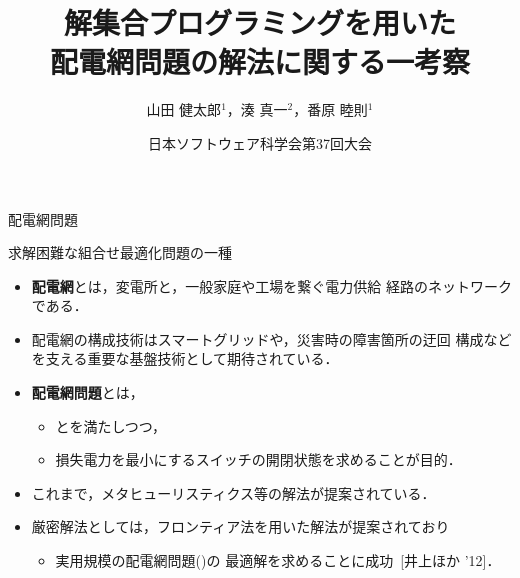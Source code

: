 \documentclass[dvipdfmx,11pt]{beamer}
\title{解集合プログラミングを用いた\\配電網問題の解法に関する一考察}
\author[山田 健太郎，湊 真一，番原 睦則]{山田 健太郎$^1$，湊 真一$^2$，番原 睦則$^1$}
\date{日本ソフトウェア科学会第37回大会}
\institute{1.名古屋大学 大学院情報学研究科 \\ 2.京都大学 大学院情報学研究科}
\begin{document}
\begin{frame}{}
  \titlepage
\end{frame}

\begin{frame}{配電網問題}
  \begin{alertblock}{}\centering
    求解困難な組合せ最適化問題の一種
  \end{alertblock}
  \vfill
  \begin{itemize}
  \item \alert{\bf 配電網}とは，変電所と，一般家庭や工場を繋ぐ電力供給
    経路のネットワークである．
  \item  配電網の構成技術はスマートグリッドや，災害時の障害箇所の迂回
    構成などを支える重要な基盤技術として期待されている．
  \item \alert{\bf 配電網問題}とは，
    \begin{itemize}
    \item {}とを満たしつつ，
    \item 損失電力を最小にするスイッチの開閉状態を求めることが目的．
    \end{itemize}
  \item これまで，メタヒューリスティクス等の解法が提案されている．
  \item 厳密解法としては，フロンティア法を用いた解法が提案されており
    \begin{itemize}
    \item 実用規模の配電網問題()の
      最適解を求めることに成功~[井上ほか '12]．
    \end{itemize}
  \end{itemize}
\end{frame}
\end{document}
